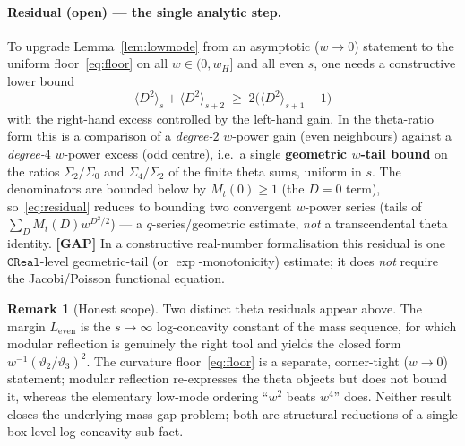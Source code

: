 \documentclass[11pt]{article}
\theoremstyle{definition}
\newtheorem{remark}{Remark}
\newcommand{\Dsq}{\langle D^2\rangle}
\begin{document}
\paragraph{Residual (open) --- the single analytic step.}
To upgrade Lemma~\ref{lem:lowmode} from an asymptotic ($w\to0$) statement to the
uniform floor~\eqref{eq:floor} on all $w\in(0,w_H]$ and all even $s$, one needs a
constructive lower bound
\begin{equation}\label{eq:residual}
  \Dsq_s+\Dsq_{s+2}\;\ge\; 2\bigl(\Dsq_{s+1}-1\bigr)
\end{equation}
with the right-hand excess controlled by the left-hand gain. In the theta-ratio
form this is a comparison of a \emph{degree-$2$} $w$-power gain (even neighbours)
against a \emph{degree-$4$} $w$-power excess (odd centre), i.e.\ a single
\textbf{geometric $w$-tail bound} on the ratios $\Sigma_2/\Sigma_0$ and
$\Sigma_4/\Sigma_2$ of the finite theta sums, uniform in $s$. The denominators
are bounded below by $M_t(0)\ge1$ (the $D=0$ term), so~\eqref{eq:residual}
reduces to bounding two convergent $w$-power series (tails of
$\sum_{D}M_t(D)w^{D^2/2}$) --- a $q$-series/geometric estimate, \emph{not} a
transcendental theta identity. \textbf{[GAP]} In a constructive real-number
formalisation this residual is one $\mathtt{CReal}$-level geometric-tail (or
$\exp$-monotonicity) estimate; it does \emph{not} require the Jacobi/Poisson
functional equation.

\begin{remark}[Honest scope]
Two distinct theta residuals appear above. The margin $L_{\mathrm{even}}$ is the
$s\to\infty$ log-concavity constant of the mass sequence, for which modular
reflection is genuinely the right tool and yields the closed form
$w^{-1}(\vartheta_2/\vartheta_3)^2$. The curvature
floor~\eqref{eq:floor} is a separate, corner-tight ($w\to0$) statement; modular
reflection re-expresses the theta objects but does not bound it, whereas the
elementary low-mode ordering ``$w^2$ beats $w^4$'' does. Neither result closes
the underlying mass-gap problem; both are structural reductions of a single
box-level log-concavity sub-fact.
\end{remark}
\end{document}
